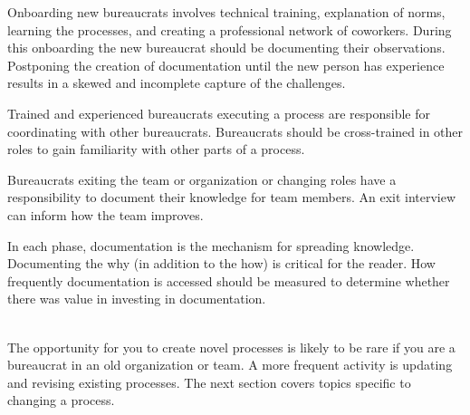 Onboarding new bureaucrats involves technical training, explanation of norms, learning the processes, and creating a professional network of coworkers. During this onboarding the new bureaucrat should be documenting their observations. Postponing the creation of documentation until the new person has experience results in a skewed and incomplete capture of the challenges.

Trained and experienced bureaucrats executing a process are responsible for coordinating with other bureaucrats. Bureaucrats should be cross-trained in other roles to gain familiarity with other parts of a process. 

Bureaucrats exiting the team or organization or changing roles have a responsibility to document their knowledge for team members. An exit interview can inform how the team improves. 

In each phase, documentation is the mechanism for spreading knowledge. Documenting the why (in addition to the how) is critical for the reader. How frequently  documentation is accessed should be measured to determine whether there was value in investing in documentation. 


\ \\

The opportunity for you to create novel processes is likely to be rare if you are a bureaucrat in an old organization or team. A more frequent activity is updating and revising existing processes. The next section covers topics specific to changing a process.